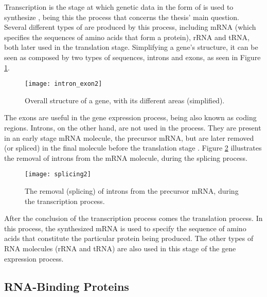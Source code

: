 Transcription is the stage at which genetic data in the form of \dna{} is used
to synthesize \rna{}, being this the process that concerns the thesis' main
question. Several different types of \rna{} are produced by this process,
including mRNA (which specifies the sequences of amino acids that form a
protein), rRNA and tRNA, both later used in the translation stage. Simplifying
a gene's structure, it can be seen as composed by two types of sequences,
introns and exons, as seen in Figure \ref{fig:intron_exon}.

\begin{figure}[!htb]
  \begin{center}
    \leavevmode
    \texttt{[image: intron\_exon2]}
    \caption[Overall structure of a gene]{Overall structure of a gene, with its
    different areas (simplified).}
    \label{fig:intron_exon}
  \end{center}
\end{figure}

The exons are useful in the gene expression process, being also known as coding
regions. Introns, on the other hand, are not used in the process. They are
present in an early stage mRNA molecule, the precursor mRNA, but are later
removed (or spliced) in the final molecule before the translation stage
\cite{leic:gene_expr}. Figure \ref{fig:splicing} illustrates the removal of
introns from the mRNA molecule, during the  splicing process.

\begin{figure}[!htb]
  \begin{center}
    \leavevmode
    \texttt{[image: splicing2]}
    \caption[Removal of introns from precursor mRNA]{The removal (splicing) of
    introns from the precursor mRNA, during the transcription process.}
    \label{fig:splicing}
  \end{center}
\end{figure}

After the conclusion of the transcription process comes the translation process.
In this process, the synthesized mRNA is used to specify the sequence of amino
acids that constitute the particular protein being produced. The other types of
RNA molecules (rRNA and tRNA) are also used in this stage of the gene expression
process.

\subsection{RNA-Binding Proteins}

